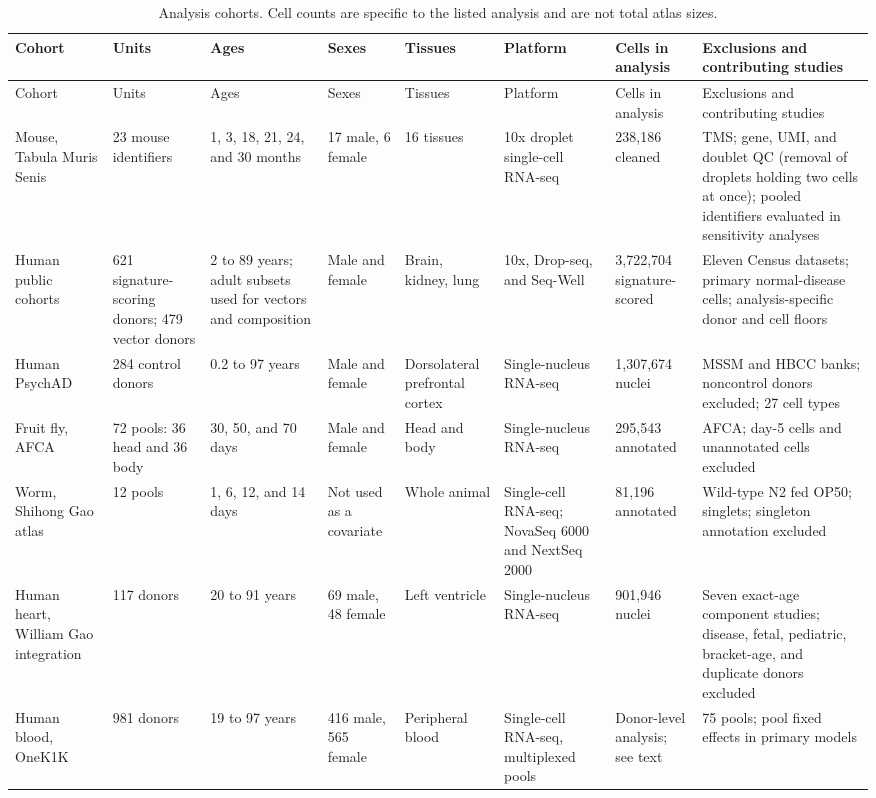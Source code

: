 \documentclass[11pt]{article}
\begin{document}
{\scriptsize\setlength{\tabcolsep}{3pt}\begin{longtable}{p{}p{}p{}p{}p{}p{}p{}p{}}
\caption{Analysis cohorts. Cell counts are specific to the listed analysis and are not total atlas sizes.}\label{tab:cohorts}\\
Cohort & Units & Ages & Sexes & Tissues & Platform & Cells in analysis & Exclusions and contributing studies \\ \hline
\endfirsthead
Cohort & Units & Ages & Sexes & Tissues & Platform & Cells in analysis & Exclusions and contributing studies \\ \hline
\endhead
Mouse, Tabula Muris Senis & 23 mouse identifiers & 1, 3, 18, 21, 24, and 30 months & 17 male, 6 female & 16 tissues & 10x droplet single-cell RNA-seq & 238,186 cleaned & TMS; gene, UMI, and doublet QC (removal of droplets holding two cells at once); pooled identifiers evaluated in sensitivity analyses \\ \hline
Human public cohorts & 621 signature-scoring donors; 479 vector donors & 2 to 89 years; adult subsets used for vectors and composition & Male and female & Brain, kidney, lung & 10x, Drop-seq, and Seq-Well & 3,722,704 signature-scored & Eleven Census datasets; primary normal-disease cells; analysis-specific donor and cell floors \\ \hline
Human PsychAD & 284 control donors & 0.2 to 97 years & Male and female & Dorsolateral prefrontal cortex & Single-nucleus RNA-seq & 1,307,674 nuclei & MSSM and HBCC banks; noncontrol donors excluded; 27 cell types \\ \hline
Fruit fly, AFCA & 72 pools: 36 head and 36 body & 30, 50, and 70 days & Male and female & Head and body & Single-nucleus RNA-seq & 295,543 annotated & AFCA; day-5 cells and unannotated cells excluded \\ \hline
Worm, Shihong Gao atlas & 12 pools & 1, 6, 12, and 14 days & Not used as a covariate & Whole animal & Single-cell RNA-seq; NovaSeq 6000 and NextSeq 2000 & 81,196 annotated & Wild-type N2 fed OP50; singlets; singleton annotation excluded \\ \hline
Human heart, William Gao integration & 117 donors & 20 to 91 years & 69 male, 48 female & Left ventricle & Single-nucleus RNA-seq & 901,946 nuclei & Seven exact-age component studies; disease, fetal, pediatric, bracket-age, and duplicate donors excluded \\ \hline
Human blood, OneK1K & 981 donors & 19 to 97 years & 416 male, 565 female & Peripheral blood & Single-cell RNA-seq, multiplexed pools & Donor-level analysis; see text & 75 pools; pool fixed effects in primary models \\ \hline

\end{longtable}}
\end{document}
